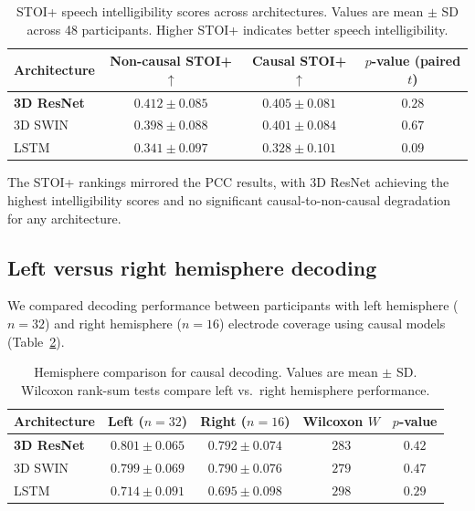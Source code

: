 \documentclass[11pt]{article}
\begin{document}
\begin{table}[H]
\centering
\caption{STOI+ speech intelligibility scores across architectures. Values are mean $\pm$ SD across 48 participants. Higher STOI+ indicates better speech intelligibility.}
\label{tab:stoi}
\begin{tabular}{lccc}
\toprule
\textbf{Architecture} & \textbf{Non-causal STOI+} $\uparrow$ & \textbf{Causal STOI+} $\uparrow$ & \textbf{$p$-value (paired $t$)} \\
\midrule
\textbf{3D ResNet} & $\mathbf{0.412 \pm 0.085}$ & $\mathbf{0.405 \pm 0.081}$ & $0.28$ \\
3D SWIN & $0.398 \pm 0.088$ & $0.401 \pm 0.084$ & $0.67$ \\
LSTM & $0.341 \pm 0.097$ & $0.328 \pm 0.101$ & $0.09$ \\
\bottomrule
\end{tabular}
\end{table}

The STOI+ rankings mirrored the PCC results, with 3D ResNet achieving the highest intelligibility scores and no significant causal-to-non-causal degradation for any architecture.

\subsection{Left versus right hemisphere decoding}

We compared decoding performance between participants with left hemisphere ($n = 32$) and right hemisphere ($n = 16$) electrode coverage using causal models (Table~\ref{tab:hemisphere}).

\begin{table}[H]
\centering
\caption{Hemisphere comparison for causal decoding. Values are mean $\pm$ SD. Wilcoxon rank-sum tests compare left vs.\ right hemisphere performance.}
\label{tab:hemisphere}
\begin{tabular}{lcccc}
\toprule
\textbf{Architecture} & \textbf{Left ($n=32$)} & \textbf{Right ($n=16$)} & \textbf{Wilcoxon $W$} & \textbf{$p$-value} \\
\midrule
\textbf{3D ResNet} & $\mathbf{0.801 \pm 0.065}$ & $\mathbf{0.792 \pm 0.074}$ & $283$ & $0.42$ \\
3D SWIN & $0.799 \pm 0.069$ & $0.790 \pm 0.076$ & $279$ & $0.47$ \\
LSTM & $0.714 \pm 0.091$ & $0.695 \pm 0.098$ & $298$ & $0.29$ \\
\bottomrule
\end{tabular}
\end{table}
\end{document}
